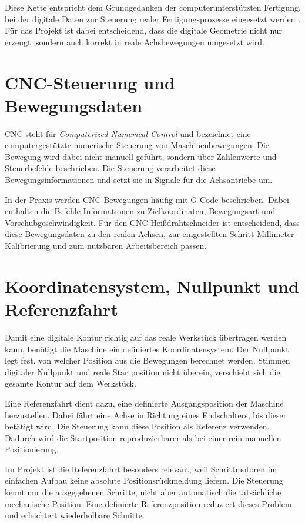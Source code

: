 Diese Kette entspricht dem Grundgedanken der computerunterstützten Fertigung, bei der digitale Daten zur Steuerung realer Fertigungsprozesse eingesetzt werden \cite{Hehenberger:2020}. Für das Projekt ist dabei entscheidend, dass die digitale Geometrie nicht nur erzeugt, sondern auch korrekt in reale Achsbewegungen umgesetzt wird.

\section{CNC-Steuerung und Bewegungsdaten}
\label{sec:cnc_steuerung_bewegungsdaten}

CNC steht für \textit{Computerized Numerical Control} und bezeichnet eine computergestützte numerische Steuerung von Maschinenbewegungen. Die Bewegung wird dabei nicht manuell geführt, sondern über Zahlenwerte und Steuerbefehle beschrieben. Die Steuerung verarbeitet diese Bewegungsinformationen und setzt sie in Signale für die Achsantriebe um.

In der Praxis werden CNC-Bewegungen häufig mit G-Code beschrieben. Dabei enthalten die Befehle Informationen zu Zielkoordinaten, Bewegungsart und Vorschubgeschwindigkeit. Für den CNC-Heißdrahtschneider ist entscheidend, dass diese Bewegungsdaten zu den realen Achsen, zur eingestellten Schritt-Millimeter-Kalibrierung und zum nutzbaren Arbeitsbereich passen.

\section{Koordinatensystem, Nullpunkt und Referenzfahrt}
\label{sec:koordinatensystem_nullpunkt_referenzfahrt}

Damit eine digitale Kontur richtig auf das reale Werkstück übertragen werden kann, benötigt die Maschine ein definiertes Koordinatensystem. Der Nullpunkt legt fest, von welcher Position aus die Bewegungen berechnet werden. Stimmen digitaler Nullpunkt und reale Startposition nicht überein, verschiebt sich die gesamte Kontur auf dem Werkstück.

Eine Referenzfahrt dient dazu, eine definierte Ausgangsposition der Maschine herzustellen. Dabei fährt eine Achse in Richtung eines Endschalters, bis dieser betätigt wird. Die Steuerung kann diese Position als Referenz verwenden. Dadurch wird die Startposition reproduzierbarer als bei einer rein manuellen Positionierung.

Im Projekt ist die Referenzfahrt besonders relevant, weil Schrittmotoren im einfachen Aufbau keine absolute Positionsrückmeldung liefern. Die Steuerung kennt nur die ausgegebenen Schritte, nicht aber automatisch die tatsächliche mechanische Position. Eine definierte Referenzposition reduziert dieses Problem und erleichtert wiederholbare Schnitte.

